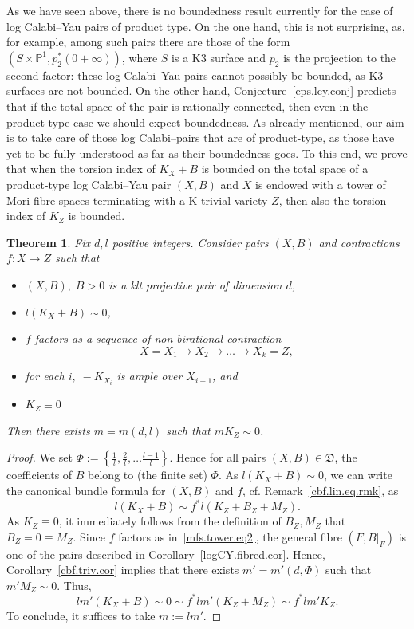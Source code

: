 \documentclass[11pt]{ip-journal}
\newtheorem{theorem}{Theorem}[section]
\theoremstyle{definition}
\begin{document}
As we have seen above, there is no boundedness result currently for the case of log Calabi--Yau pairs of product type.
On the one hand, this is not surprising, as, for example, among such pairs there are those of the form $(S \times \mathbb{P}^1, p_2^\ast(0 + \infty))$, where $S$ is a K3 surface and $p_2$ is the projection to the second factor: these log Calabi--Yau pairs cannot possibly be bounded, as K3 surfaces are not bounded.
On the other hand, Conjecture~\ref{eps.lcy.conj} predicts that if the total space of the pair is rationally connected, then even in the product-type case we should expect boundedness.
As already mentioned, our aim is to take care of those log Calabi--pairs that are of product-type, as those have yet to be fully understood as far as their boundedness goes.
To this end, we prove that when the torsion index of $K_X+B$ is bounded on the total space of a product-type log Calabi--Yau pair $(X, B)$ and $X$ is endowed with a tower of Mori fibre spaces terminating with a K-trivial variety $Z$, then also the torsion index of $K_Z$ is bounded.

\begin{theorem}
\label{mfs.tow.CYend.thm}
Fix $d, l$ positive integers.
Consider pairs $(X, B)$ and contractions $f \colon X \to Z$ such that
\begin{itemize}
    \item $(X, B), \; B>0$ is a klt projective pair of dimension $d$,
    \item $l(K_X+B) \sim 0$,
    \item $f$ factors as a sequence of non-birational contraction
    \begin{equation}
    \label{mfs.tower.eq2}
        X = X_1 \to X_2 \to \dots \to X_k = Z,
    \end{equation}
     \item for each $i, \; -K_{X_i}$ is ample over $X_{i+1}$, and
    \item $K_Z \equiv 0$
\end{itemize}
Then there exists $m=m(d, l)$ such that $mK_Z \sim 0$.
\end{theorem}

\begin{proof}
We set 
$\Phi:= \left\{ \frac 1l, \frac 2l, \dots \frac{l-1}l \right\}$.
Hence for all pairs 
$(X, B) \in \mathfrak D$, 
the coefficients of 
$B$ 
belong to (the finite set)
$\Phi$.
\newline
As $l(K_X+B) \sim 0$, we can write the canonical bundle formula for $(X, B)$ and $f$, cf. Remark~\ref{cbf.lin.eq.rmk}, as
\[
l(K_X+B) \sim f^\ast l(K_Z+B_Z+M_Z).
\]
As $K_Z \equiv 0$, it immediately follows from the definition of $B_Z, M_Z$ that $B_Z = 0 \equiv M_Z$. 
Since $f$ factors as in~\eqref{mfs.tower.eq2}, the general fibre $(F, B|_F)$ is one of the pairs described in Corollary~\ref{logCY.fibred.cor}.
Hence, Corollary~\ref{cbf.triv.cor} implies that there exists $m'=m'(d, \Phi)$ such that $m'M_Z \sim 0$.
Thus,
\[
lm'(K_X+B) \sim 0 \sim f^\ast lm'(K_Z+M_Z) \sim f^\ast lm'K_Z.
\]
To conclude, it suffices to take $m:=lm'$.
\end{proof} 
\end{document}
